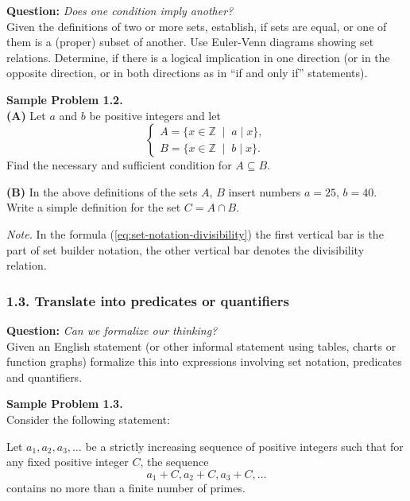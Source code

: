 \documentclass[jou]{apa6}
\begin{document}
{\bf Question:} {\em Does one condition imply another?}\\
{\scriptsize 
Given the definitions of two or more sets, establish, if sets are equal, 
or one of them is a (proper) subset of another. Use Euler-Venn diagrams 
showing set relations. Determine, if there is a logical implication 
in one direction (or in the opposite direction, or in both directions 
as in ``if and only if'' statements).
}

\vspace{6pt}
{\bf Sample Problem 1.2.}\\
{\bf (A)} Let $a$ and $b$ be positive integers and let
\begin{equation}
\label{eq:set-notation-divisibility}
\left\{ \begin{array}{l}
A = \{ x \in \mathbb{Z}\;\mid\;a\mid{}x\},\\
B = \{ x \in \mathbb{Z}\;\mid\;b\mid{}x\}.
\end{array} \right.
\end{equation}
Find the necessary and sufficient condition for $A \subseteq B$. 

{\bf (B)} In the above definitions of the sets $A$, $B$ insert numbers
$a = 25$, $b = 40$. Write a simple definition for the set $C = A \cap B$. 

\vspace{4pt}
{\em Note.} In the formula (\ref{eq:set-notation-divisibility}) the first vertical 
bar is the part of set builder notation, the other vertical 
bar denotes the divisibility relation.



\subsubsection{1.3. Translate into predicates or quantifiers} 

{\bf Question:} {\em Can we formalize our thinking?}\\
{\scriptsize
Given an English statement (or other informal statement using tables, charts or function graphs) 
formalize this into expressions involving set notation, predicates and quantifiers. 
}


\vspace{6pt}
{\bf Sample Problem 1.3.}\\
Consider the following statement:
\begin{mdframed}[roundcorner=6pt]
Let $a_1,a_2,a_3,\ldots$ be a strictly increasing sequence of positive integers such that for any fixed positive integer $C$, the
sequence 
$$a_1+C, a_2+C, a_3 + C, \ldots$$
contains no more than a finite number of primes. 
\end{mdframed}
\end{document}
